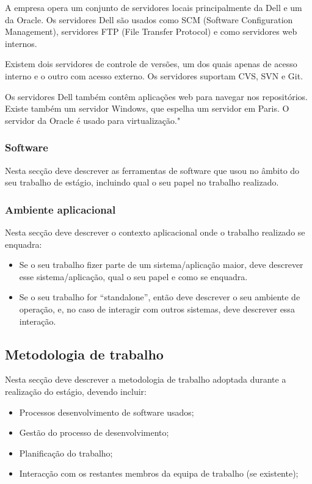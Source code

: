 \documentclass{article}
\begin{document}
A empresa opera um conjunto de servidores locais principalmente da Dell e um da Oracle. Os servidores Dell são usados como SCM (Software Configuration Management),  servidores FTP (File Transfer Protocol) e como servidores web internos. 

Existem dois servidores de controle de versões, um dos quais apenas de acesso interno e o outro com acesso externo. Os servidores suportam CVS, SVN e Git.

Os servidores Dell também contêm aplicações web para navegar nos repositórios. Existe também um servidor Windows, que espelha um servidor em Paris. O servidor da Oracle é usado para virtualização."


\subsubsection{Software}
Nesta secção deve descrever as ferramentas de software que usou no âmbito do seu trabalho de estágio, incluindo qual o seu papel no trabalho realizado.

\subsubsection{Ambiente aplicacional}
Nesta secção deve descrever o contexto aplicacional onde o trabalho realizado se enquadra:

\begin{itemize}
\item Se o seu trabalho fizer parte de um sistema/aplicação maior, deve descrever esse sistema/aplicação, qual o seu papel e como se enquadra. 
\item Se o seu trabalho for “standalone”, então deve descrever o seu ambiente de operação, e, no caso de interagir com outros sistemas, deve descrever essa interação.
\end{itemize}


\subsection{Metodologia de trabalho}
Nesta secção deve descrever a metodologia de trabalho adoptada durante a realização do estágio, devendo incluir:

\begin{itemize}
    
\item Processos desenvolvimento de software usados;
\item Gestão do processo de desenvolvimento;
\item Planificação do trabalho;
\item Interacção com os restantes membros da equipa de trabalho (se existente);

\end{itemize}
\end{document}
